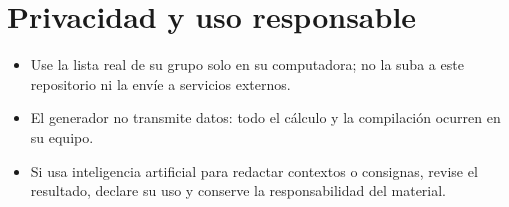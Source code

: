 \documentclass[11pt]{article}
\begin{document}
\section{Privacidad y uso responsable}

\begin{itemize}[leftmargin=*]
\item Use la lista real de su grupo solo en su computadora; no la suba a este repositorio ni la envíe a servicios externos.
\item El generador no transmite datos: todo el cálculo y la compilación ocurren en su equipo.
\item Si usa inteligencia artificial para redactar contextos o consignas, revise el resultado, declare su uso y conserve la responsabilidad del material.
\end{itemize}
\end{document}

